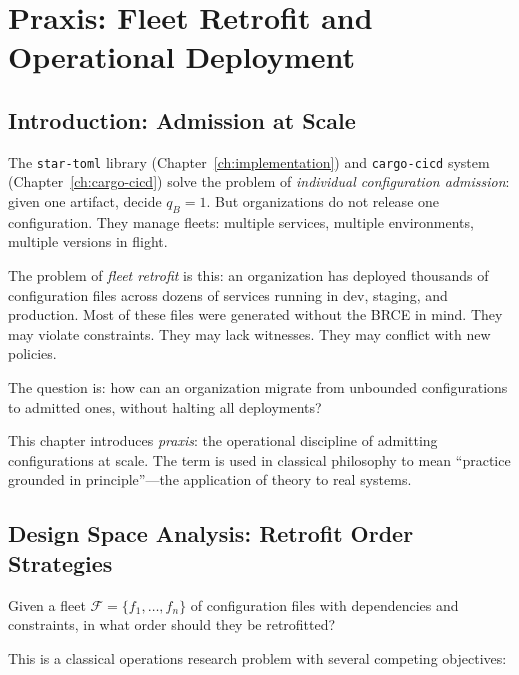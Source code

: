 
\chapter{Praxis: Fleet Retrofit and Operational Deployment}
\label{ch:praxis}

\section{Introduction: Admission at Scale}

The \texttt{star-toml} library (Chapter~\ref{ch:implementation}) and \texttt{cargo-cicd} system (Chapter~\ref{ch:cargo-cicd}) solve the problem of \emph{individual configuration admission}: given one artifact, decide $q_B = 1$. But organizations do not release one configuration. They manage fleets: multiple services, multiple environments, multiple versions in flight.

The problem of \emph{fleet retrofit} is this: an organization has deployed thousands of configuration files across dozens of services running in dev, staging, and production. Most of these files were generated without the BRCE in mind. They may violate constraints. They may lack witnesses. They may conflict with new policies.

The question is: how can an organization migrate from unbounded configurations to admitted ones, without halting all deployments?

This chapter introduces \emph{praxis}: the operational discipline of admitting configurations at scale. The term is used in classical philosophy to mean ``practice grounded in principle''---the application of theory to real systems.

\section{Design Space Analysis: Retrofit Order Strategies}

Given a fleet $\mathcal{F} = \{f_1, \ldots, f_n\}$ of configuration files with dependencies and constraints, in what order should they be retrofitted?

This is a classical operations research problem with several competing objectives:

